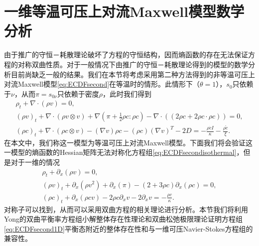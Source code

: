 
\section{一维等温可压上对流Maxwell模型数学分析}
由于推广的守恒－耗散理论破坏了方程的守恒结构，因而熵函数的存在无法保证方程的对称双曲性质。对于一般情况下由推广的守恒－耗散理论得到的模型的数学分析目前尚缺乏一般的结果。我们在本节将考虑采用第二种方法得到的非等温可压上对流Maxwell模型\eqref{eq:ECDFsecond}在等温时的情形。此情形下（$\theta=1$），$s_0$只依赖于$\nu$，从而$\pi = s_{0\nu}$只依赖于密度$\rho$，此时我们得到
	\begin{subequations} \label{eq:ECDFsecondisothermal}
		\begin{align}
			\rho_t + \nabla \cdot (\rho v) = 0 ,\\
			(\rho v)_t + \nabla \cdot (\rho v \otimes v) + \nabla (\pi + \frac{1}{2} \rho c: \rho c)  - \nabla \cdot ( (2 \rho c + 2 \rho c \cdot \rho c)) =0 ,\\
			(\rho c)_t +  \nabla \cdot (\rho c \otimes v) - (\nabla v) \rho c - (\rho c) (\nabla v)^T - 2 D = - \frac{\rho \dot{c}I}{\kappa} -  \frac{\rho \mathring{c}}{\xi}  .
		\end{align}
	\end{subequations}
	在本文中，我们称这一模型为等温可压上对流Maxwell模型。下面我们将会验证这一模型的熵函数的Hessian矩阵无法对称化方程组\eqref{eq:ECDFsecondisothermal}，但是对于一维的情况
\begin{subequations} \label{eq:ECDFsecond1D}
		\begin{align}
			\rho_t + \partial_x (\rho v) = 0 ,\\
			(\rho v)_t + \partial_x (\rho v^2) + \partial_x (\pi)   -  (2+ 3 \rho c) \partial_x (  \rho c) =0 ,\\
			(\rho c)_t +  \partial_x (\rho c  v) - 2 \rho c \partial_x  v  - 2 \partial_x v = - \frac{\rho {c}}{\kappa}  .
		\end{align}
\end{subequations}
对称子可以找到，从而可以采用双曲方程的相关理论进行分析。本节我们将利用Yong的双曲平衡率方程组小解整体存在性理论和双曲松弛极限理论证明方程组\eqref{eq:ECDFsecond1D}平衡态附近的整体存在性和与一维可压Navier-Stokes方程组的兼容性。

